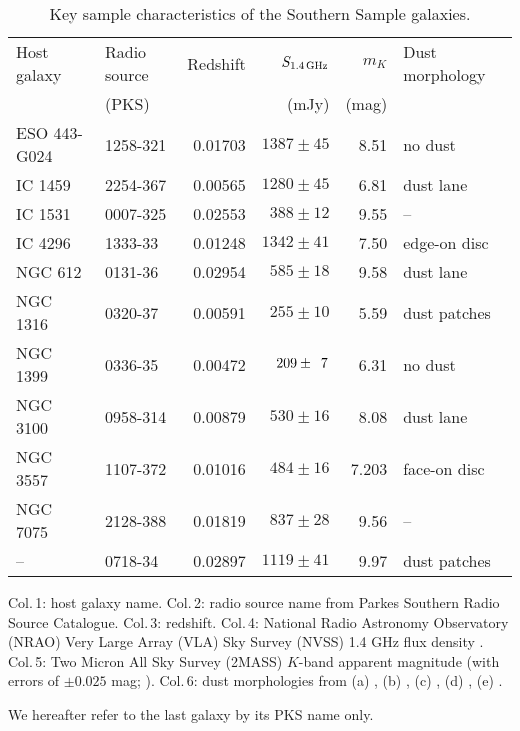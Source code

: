 \documentclass[fleqn,usenatbib,useAMS]{mnras}
\begin{document}
	\begin{table*}
		\centering
	\begin{threeparttable}
		\caption{Key sample characteristics of the Southern Sample galaxies.}
		\label{tab:sample}
		\begin{tabular}{l l r r r l}
			\hline
			\hline
			Host galaxy	& Radio source 	& Redshift	& $S_\text{1.4\,GHz}$	& $m_K$ & Dust morphology\\
						& (PKS) 		& 			& (mJy) 			& (mag)	&\\
			\hline 
			ESO 443-G024 & 1258-321 	& 0.01703	& $1387 \pm 45$		& 8.51 & no dust\tnote{a}	\\ 
			IC 1459 	& 2254-367 		& 0.00565 	& $1280 \pm 45$		& 6.81 & dust lane\tnote{b}	\\
			IC 1531 	& 0007-325 		& 0.02553 	& $388 \pm 12$		& 9.55 & --					\\
			IC 4296		& 1333-\leavevmode\phantom{0}33 		& 0.01248 	& $1342 \pm 41$		& 7.50 & edge-on disc\tnote{b} \\
			NGC 612 	& 0131-\leavevmode\phantom{0}36 		& 0.02954 	& $585 \pm 18$		& 9.58 & dust lane\tnote{c}	\\
			NGC 1316 	& 0320-\leavevmode\phantom{0}37 & 0.00591 	& $255 \pm 10$		& 5.59 & dust patches\tnote{b} \\
			NGC 1399 	& 0336-\leavevmode\phantom{0}35 & 0.00472 	& $209 \pm \leavevmode\phantom{0}7$	& 6.31 & no dust\tnote{b}	\\
			NGC 3100 	& 0958-314 		& 0.00879 	& $530 \pm 16$		& 8.08 & dust lane\tnote{d}	\\
			NGC 3557 	& 1107-372 		& 0.01016 	& $484 \pm 16$		& 7.203 & face-on disc\tnote{b}\\
			NGC 7075 	& 2128-388 		& 0.01819 	& $837 \pm 28$		& 9.56 & --					\\
			--			& 0718-\leavevmode\phantom{0}34 		& 0.02897 	& $1119 \pm 41$		& 9.97 & dust patches\tnote{e} \\
			\hline
			\hline
		\end{tabular}
		\begin{tablenotes}
		\footnotesize
		\note Col.\,1: host galaxy name. Col.\,2: radio source name from Parkes Southern Radio Source Catalogue. Col.\,3: redshift. Col.\,4: National Radio Astronomy Observatory (NRAO) Very Large Array (VLA) Sky Survey (NVSS) 1.4 GHz flux density \citep{Condon1998}. Col.\,5: Two Micron All Sky Survey (2MASS) $K$-band apparent magnitude (with errors of $\pm 0.025$ mag; \citealt{Skrutskie2006}). Col.\,6: dust morphologies from (a) \citet{Govoni2000}, (b) \citet{Lauer2005}, (c) \citet{Bettoni2001}, (d) \citet{Sandage1979}, (e) \citet{Colbert2001}. 
		\item We hereafter refer to the last galaxy by its PKS name only.
		\end{tablenotes}
	\end{threeparttable}
	\end{table*}
\end{document}
